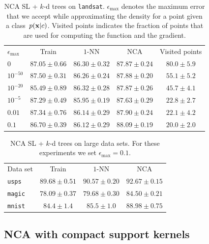 \begin{table}
  \centering
 	\begin{tabular}{lcccc}
 	\toprule
 	$\epsilon_{\max}$ & Train & $1$-NN & NCA & Visited points\\
 	\cmidrule(r){2-2}\cmidrule(r){3-4}\cmidrule(r){5-5}
$0$&$87.05 \pm 0.66$&$86.30 \pm 0.32$&$87.87 \pm 0.24$&$80.0 \pm 5.9$\\
$10^{-50}$&$87.50 \pm 0.31$&$86.26 \pm 0.24$&$87.88 \pm 0.20$&$55.1 \pm 5.2$\\
$10^{-20}$&$85.49 \pm 0.89$&$86.32 \pm 0.28$&$87.87 \pm 0.26$&$45.7 \pm 4.1$\\
$10^{-5}$&$87.29 \pm 0.49$&$85.95 \pm 0.19$&$87.63 \pm 0.29$&$22.8 \pm 2.7$\\
$0.01$&$87.34 \pm 0.76$&$86.14 \pm 0.29$&$87.90 \pm 0.24$&$22.1 \pm 4.2$\\
$0.1$&$86.70 \pm 0.39$&$86.12 \pm 0.29$&$88.09 \pm 0.19$&$20.0 \pm 2.0$\\
\bottomrule
  \end{tabular}
  \caption{NCA SL + $k$-d trees on \texttt{landsat}. $\epsilon_{\max}$ denotes the maximum error that we accept while approximating the density for a point given a class~$p(\mathbf{x}|c)$. Visited points indicates the fraction of points that are used for computing the function and the gradient.}
  \label{tab:nca-sl-k-d-trees-landsat}
\end{table}


\begin{table}
  \centering
 	\begin{tabular}{lccc}
 	\toprule
 	Data set & Train & $1$-NN & NCA \\
 	\cmidrule(r){2-2}\cmidrule(r){3-4}
 	\texttt{usps}&$89.68 \pm 0.51$&$90.57 \pm 0.20$&$92.67 \pm 0.15$\\
\texttt{magic}&$78.09 \pm 0.37$&$79.68 \pm 0.30$&$84.50 \pm 0.21$\\
\texttt{mnist}&$84.4 \pm 1.4$&$85.5 \pm 1.0$&$88.98 \pm 0.75$\\
  \bottomrule
  \end{tabular}
  \caption{NCA SL + $k$-d trees on large data sets. For these experiments we set $\epsilon_{\max}=0.1$.}
  \label{tab:nca-sl-k-d-trees}
\end{table}

\subsection{NCA with compact support kernels}
\label{subsec:eval-nca-cs}

